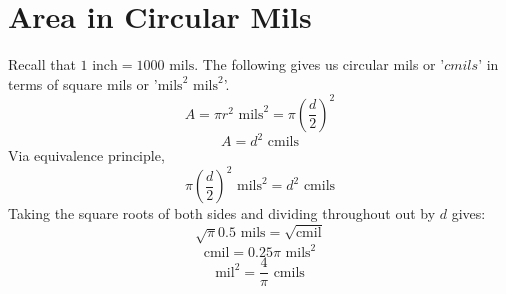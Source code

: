 \documentclass{article}
\begin{document}
	\section[cmils]{Area in Circular Mils}
	Recall that $1 \text{ inch} = 1000 \text{ mils}$.  The following gives us 
	circular mils or 
	'$cmils$' in terms of square mils or '$\text{mils}^2\text{ mils}^2$'.
	$$ A = \pi r^2\text{ mils}^2 = \pi \left(\frac{d}{2}\right)^2$$
	$$ A = d^2 \text{ cmils}$$
	Via equivalence principle,
	$$ \pi \left(\frac{d}{2}\right)^2 \text{ mils}^2 = d^2 \text{ cmils}$$
	Taking the square roots of both sides and dividing throughout out by $d$ 
	gives:
	$$ \sqrt{\pi}0.5 \text{ mils} = \sqrt{ \text{cmil}}$$
	$$ \text{cmil} = 0.25\pi \text{ mils}^2 $$
	$$ \text{mil}^2 = \frac{4}{\pi} \text{ cmils}$$
\end{document}
